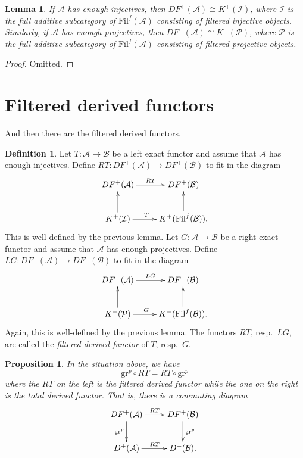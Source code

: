 \documentclass{stacks-project}
\theoremstyle{plain}
\newtheorem{proposition}[subsection]{Proposition}
\newtheorem{lemma}[subsection]{Lemma}
\theoremstyle{definition}
\newtheorem{definition}[subsection]{Definition}
\theoremstyle{remark}
\numberwithin{equation}{subsection}
\begin{document}
\begin{lemma}
\label{lemma-filtered-derived-category}
If $\mathcal{A}$ has enough injectives, then $DF^+(\mathcal{A}) \cong
K^+(\mathcal{I})$, where $\mathcal{I}$ is the full additive subcategory of
$\text{Fil}^f(\mathcal{A})$ consisting of filtered injective objects.
Similarly, if $\mathcal{A}$ has enough projectives, then $DF^-(\mathcal{A})
\cong K^-(\mathcal{P})$, where $\mathcal P$ is the full additive subcategory of
$\text{Fil}^f(\mathcal{A})$ consisting of filtered projective objects.
\end{lemma}

\begin{proof}
Omitted.
\end{proof}





\section{Filtered derived functors}
\label{section-filtered-derived-functors}

\noindent
And then there are the filtered derived functors.

\begin{definition}
\label{definition-filtered-derived-functors}
Let $T: \mathcal{A} \to \mathcal{B}$ be a left exact functor and assume that
$\mathcal{A}$ has enough injectives. Define $RT: DF^+(\mathcal{A}) \to D
F^+(\mathcal{B})$ to fit in the diagram
$$
\xymatrix{
DF^+(\mathcal{A}) \ar[r]^{RT} & DF^+(\mathcal{B}) \\
K^+(\mathcal{I}) \ar[u] \ar[r]^{T \quad} & K^+(\text{Fil}^f(\mathcal{B})).
\ar[u]}
$$
This is well-defined by the previous lemma. Let $G: \mathcal{A} \to
\mathcal{B}$ be a right exact functor and assume that $\mathcal{A}$ has enough
projectives. Define $LG: DF^-(\mathcal{A}) \to DF^-(\mathcal{B})$ to fit in
the diagram
$$
\xymatrix{
DF^-(\mathcal{A}) \ar[r]^{LG} & DF^-(\mathcal{B}) \\
K^-(\mathcal{P}) \ar[u] \ar[r]^{G \quad} & K^-(\text{Fil}^f(\mathcal{B})).
\ar[u]}
$$
Again, this is well-defined by the previous lemma.
The functors $RT$, resp.\ $LG$, are called the {\it filtered derived
functor} of $T$, resp.\ $G$.
\end{definition}

\begin{proposition}
\label{proposition-compare-filtered-graded}
In the situation above, we have
$$
\text{gr}^p \circ RT = RT \circ \text{gr}^p
$$
where the $RT$ on the left is the filtered derived functor while the one on the
right is the total derived functor. That is, there is a commuting diagram
$$
\xymatrix{
DF^+(\mathcal{A}) \ar[r]^{RT} \ar[d]_{\text{gr}^p} & DF^+(\mathcal{B})
\ar[d]^{\text{gr}^p}\\
D^+(\mathcal{A}) \ar[r]^{RT} & D^+(\mathcal{B}).}
$$
\end{proposition}
\end{document}
